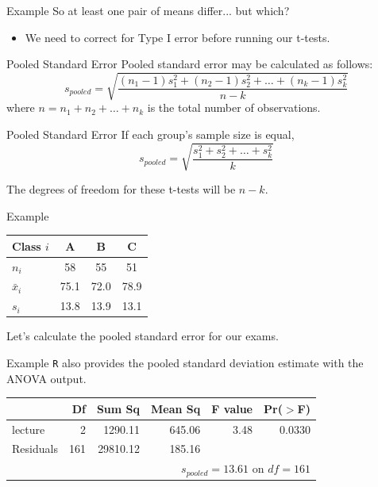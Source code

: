 \begin{frame}{Example}
    So at least one pair of means differ... but which?
    \begin{itemize}
        \item We need to correct for Type I error before running our t-tests.
    \end{itemize}
\end{frame}

\begin{frame}{Pooled Standard Error}
    Pooled standard error may be calculated as follows:
    \[
        s_{pooled} = \sqrt{\frac{(n_1-1)s_1^2 + (n_2-1)s_2^2 + \dots + (n_k-1)s_k^2}{n - k}}
    \]
    where $n = n_1 + n_2 + \dots + n_k$ is the total number of observations.
\end{frame}

\begin{frame}{Pooled Standard Error}
    If each group's sample size is equal,
    \[
        s_{pooled} = \sqrt{\frac{s_1^2 + s_2^2 + \dots + s_k^2}{k}}
    \]
    
    The degrees of freedom for these t-tests will be $n-k$.
\end{frame}

\begin{frame}{Example}
    \begin{table}[]
        \centering
        \begin{tabular}{l ccc}
            \hline
            Class $i$ & A & B & C \\
            \hline
            $n_i$ & 58 & 55 & 51 \\
            $\bar{x}_i$ & 75.1 & 72.0 & 78.9 \\
            $s_i$ & 13.8 & 13.9 & 13.1 \\
            \hline
        \end{tabular}
    \end{table}
    Let's calculate the pooled standard error for our exams.
\end{frame}

\begin{frame}{Example}
    \texttt{R} also provides the pooled standard deviation estimate with the ANOVA output.
    \begin{table}[]
        \centering
        \begin{tabular}{l rrrrr}
            \hline
             & Df & Sum Sq & Mean Sq & F value & Pr($>$F) \\
            \hline
            lecture     & 2   & 1290.11 & 645.06 & 3.48 & 0.0330 \\
            Residuals   & 161 & 29810.12 & 185.16 & & \\
            \hline
             & & & \multicolumn{3}{r}{$s_{pooled} = 13.61$ on $df=161$}
        \end{tabular}
    \end{table}
\end{frame}

